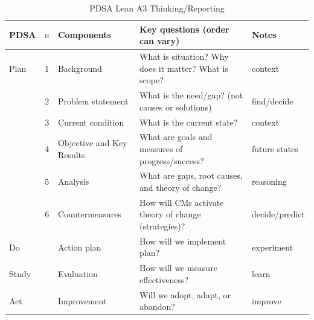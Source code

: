 \documentclass[landscape]{article}
\begin{document}
\begin{table}
  \centering
  \caption{PDSA Lean A3 Thinking/Reporting}
\begin{tabular}{lclll}
\toprule
             PDSA&$n$&Components&Key questions (order can vary)&Notes\\
\midrule
  Plan &1&Background&What is situation? Why does it matter? What is scope?&context\\
       &2&Problem statement&What is the need/gap? (not causes or solutions)&find/decide\\
       &3&Current condition&What is the current state?&context\\
       &4&Objective and Key Results&What are goals and measures of
                                     progress/success?&future states\\
       &5&Analysis&What are gaps, root causes, and theory of change?&reasoning\\
       &6&Countermeasures&How will CMs activate theory of change (strategies)?&decide/predict\\
  Do   &&Action plan&How will we implement plan?&experiment\\
  Study&&Evaluation&How will we measure effectiveness?&learn\\
  Act  &&Improvement&Will we adopt, adapt, or abandon?&improve\\
\bottomrule
\end{tabular}   
\end{table}


\bigskip
\end{document}
